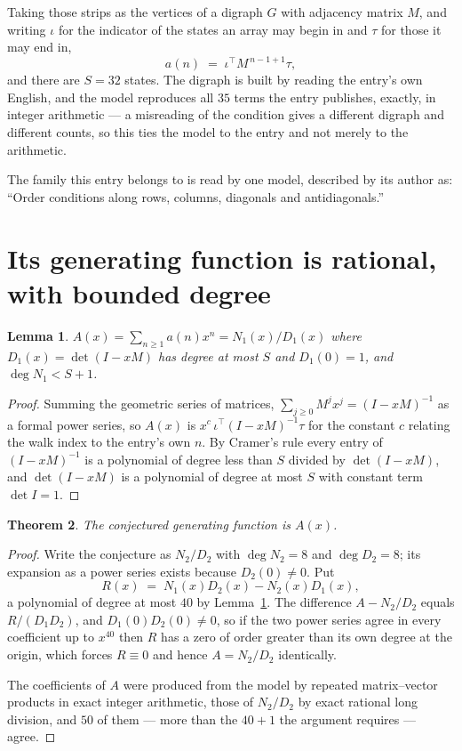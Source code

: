 \documentclass[11pt,a4paper]{article}
\theoremstyle{plain}
\newtheorem{theorem}{Theorem}
\newtheorem{lemma}[theorem]{Lemma}
\theoremstyle{definition}
\begin{document}
Taking those strips as the vertices of a digraph $G$ with adjacency matrix $M$, and writing
$\iota$ for the indicator of the states an array may begin in and $\tau$ for those it may end
in,
\[
a(n)\;=\;\iota^{\!\top}M^{\,n-1+1}\tau ,
\]
and there are $S=32$ states. The digraph is built by reading the entry's own English, and the
model reproduces all $35$ terms the entry publishes, exactly, in integer arithmetic --- a
misreading of the condition gives a different digraph and different counts, so this ties the
model to the entry and not merely to the arithmetic.

The family this entry belongs to is read by one model, described by its author as: ``Order conditions along rows, columns, diagonals and antidiagonals.''


\section{Its generating function is rational, with bounded degree}

\begin{lemma}\label{lem:rat}
$A(x)=\sum_{n\ge1}a(n)x^n=N_1(x)/D_1(x)$ where $D_1(x)=\det(I-xM)$ has degree at most
$S$ and $D_1(0)=1$, and $\deg N_1<S+1$.
\end{lemma}

\begin{proof}
Summing the geometric series of matrices, $\sum_{j\ge0}M^jx^j=(I-xM)^{-1}$ as a formal
power series, so $A(x)$ is $x^{c}\,\iota^{\!\top}(I-xM)^{-1}\tau$ for the constant $c$
relating the walk index to the entry's own $n$. By Cramer's rule every entry of
$(I-xM)^{-1}$ is a polynomial of degree less than $S$ divided by $\det(I-xM)$, and
$\det(I-xM)$ is a polynomial of degree at most $S$ with constant term $\det I=1$.
\end{proof}

\begin{theorem}
The conjectured generating function is $A(x)$.
\end{theorem}

\begin{proof}
Write the conjecture as $N_2/D_2$ with $\deg N_2=8$ and $\deg D_2=8$; its expansion as a
power series exists because $D_2(0)\neq0$. Put
\[
R(x)\;=\;N_1(x)D_2(x)-N_2(x)D_1(x),
\]
a polynomial of degree at most $40$ by Lemma~\ref{lem:rat}. The difference
$A-N_2/D_2$ equals $R/(D_1D_2)$, and $D_1(0)D_2(0)\neq0$, so if the two power series agree in
every coefficient up to $x^{40}$ then $R$ has a zero of order greater than its own
degree at the origin, which forces $R\equiv0$ and hence $A=N_2/D_2$ identically.

The coefficients of $A$ were produced from the model by repeated matrix--vector products in
exact integer arithmetic, those of $N_2/D_2$ by exact rational long division, and $50$
of them --- more than the $40+1$ the argument requires --- agree.
\end{proof}
\end{document}
